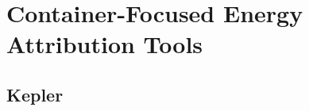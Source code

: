 \section{Container-Focused Energy Attribution Tools}
\label{sec:container-tools}


































































\subsection{Kepler}
\label{sec:kepler}
%




